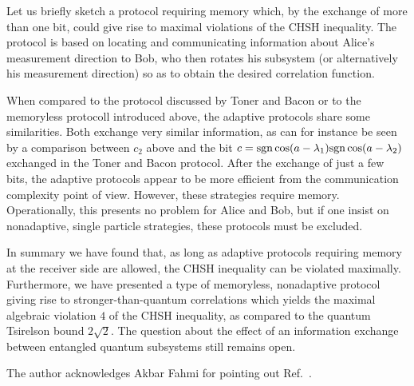 \documentclass[prl,preprint,amsfonts,showpacs,showkeys]{revtex4}
\begin{document}
Let us briefly sketch a protocol requiring memory which,
by the exchange of more than one bit,
could give rise to maximal violations \cite{svozil-krenn}
of the CHSH
inequality.
The protocol  is based on locating and communicating information about
Alice's measurement direction
to Bob, who then rotates his subsystem
(or alternatively his measurement direction)
so as to obtain the desired correlation function.

When compared to the protocol discussed by Toner and Bacon \cite{toner-bacon-03}
or to the memoryless protocoll introduced above,
the adaptive protocols share some similarities.
Both exchange very similar information,
as can for instance be seen by a comparison between $c_2$ above
and the bit
$c= {\rm sgn} \cos ({ a} - { \lambda }_1 ){\rm sgn} \cos ({ a} - { \lambda }_2 )$
exchanged in the  Toner and Bacon protocol.
After the exchange of just a few bits, the adaptive protocols
appear to be more efficient
from the communication complexity point of view.
However, these strategies  require memory.
Operationally, this presents no problem for Alice and Bob,
but if one insist on nonadaptive, single particle strategies,
these protocols must be excluded.


In summary we have found that, as long as adaptive protocols
requiring memory at the receiver side are allowed,
the CHSH inequality can be violated maximally.
Furthermore, we have presented a type of memoryless, nonadaptive protocol
giving rise to stronger-than-quantum correlations which
yields the maximal algebraic violation $4$ of the CHSH inequality,
as compared to the quantum Tsirelson bound $2\sqrt{2}$.
The question  about the effect of an information exchange between entangled quantum subsystems still remains open.





The author acknowledges Akbar Fahmi for pointing out Ref.~\cite{popescu-97b}.


%
%
%
%
%
\end{document}
